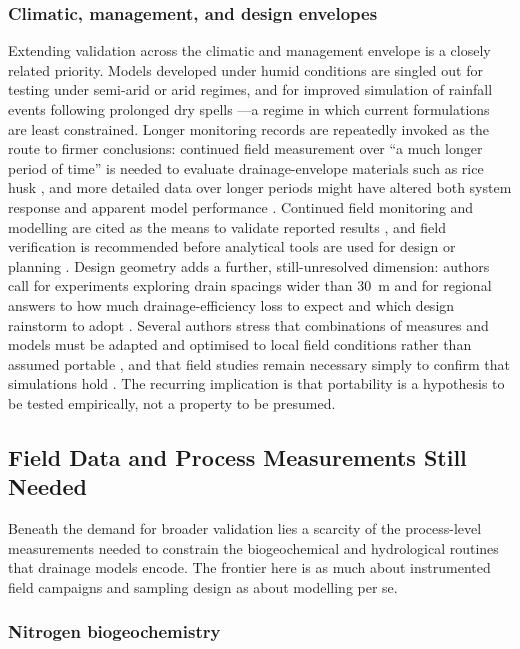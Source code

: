 \documentclass[11pt]{article}
\begin{document}
\subsubsection{Climatic, management, and design envelopes}

Extending validation across the climatic and management envelope is a closely related priority. Models developed under humid conditions are singled out for testing under semi-arid or arid regimes, and for improved simulation of rainfall events following prolonged dry spells \parencite{Prasher1996}---a regime in which current formulations are least constrained. Longer monitoring records are repeatedly invoked as the route to firmer conclusions: continued field measurement over ``a much longer period of time'' is needed to evaluate drainage-envelope materials such as rice husk \parencite{Ebrahimian2011}, and more detailed data over longer periods might have altered both system response and apparent model performance \parencite{Negm2017}. Continued field monitoring and modelling are cited as the means to validate reported results \parencite{Grazhdani1996}, and field verification is recommended before analytical tools are used for design or planning \parencite{Hornbuckle2012}. Design geometry adds a further, still-unresolved dimension: authors call for experiments exploring drain spacings wider than 30~m \parencite{Mathew2001} and for regional answers to how much drainage-efficiency loss to expect and which design rainstorm to adopt \parencite{Wiskow2003}. Several authors stress that combinations of measures and models must be adapted and optimised to local field conditions rather than assumed portable \parencite{MULLER1988}, and that field studies remain necessary simply to confirm that simulations hold \parencite{Shipitalo2016,Yousfi2014}. The recurring implication is that portability is a hypothesis to be tested empirically, not a property to be presumed.

\subsection{Field Data and Process Measurements Still Needed}

Beneath the demand for broader validation lies a scarcity of the process-level measurements needed to constrain the biogeochemical and hydrological routines that drainage models encode. The frontier here is as much about instrumented field campaigns and sampling design as about modelling per se.

\subsubsection{Nitrogen biogeochemistry}
\end{document}
